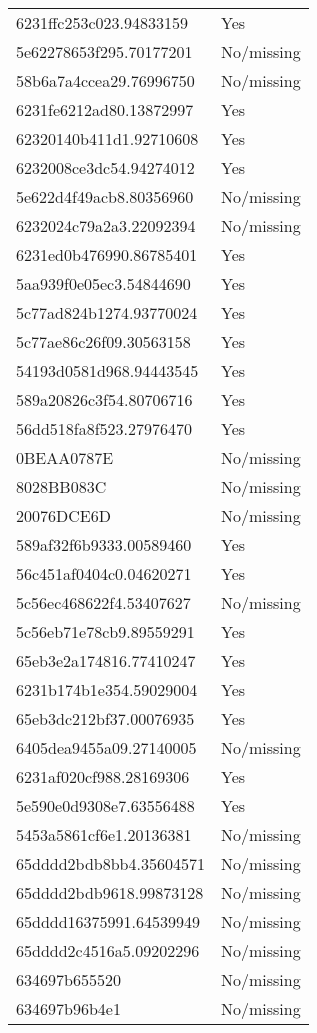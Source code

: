 \begin{tabular}{ll}
6231ffc253c023.94833159 & Yes \\
5e62278653f295.70177201 & No/missing \\
58b6a7a4ccea29.76996750 & No/missing \\
6231fe6212ad80.13872997 & Yes \\
62320140b411d1.92710608 & Yes \\
6232008ce3dc54.94274012 & Yes \\
5e622d4f49acb8.80356960 & No/missing \\
6232024c79a2a3.22092394 & No/missing \\
6231ed0b476990.86785401 & Yes \\
5aa939f0e05ec3.54844690 & Yes \\
5c77ad824b1274.93770024 & Yes \\
5c77ae86c26f09.30563158 & Yes \\
54193d0581d968.94443545 & Yes \\
589a20826c3f54.80706716 & Yes \\
56dd518fa8f523.27976470 & Yes \\
0BEAA0787E & No/missing \\
8028BB083C & No/missing \\
20076DCE6D & No/missing \\
589af32f6b9333.00589460 & Yes \\
56c451af0404c0.04620271 & Yes \\
5c56ec468622f4.53407627 & No/missing \\
5c56eb71e78cb9.89559291 & Yes \\
65eb3e2a174816.77410247 & Yes \\
6231b174b1e354.59029004 & Yes \\
65eb3dc212bf37.00076935 & Yes \\
6405dea9455a09.27140005 & No/missing \\
6231af020cf988.28169306 & Yes \\
5e590e0d9308e7.63556488 & Yes \\
5453a5861cf6e1.20136381 & No/missing \\
65dddd2bdb8bb4.35604571 & No/missing \\
65dddd2bdb9618.99873128 & No/missing \\
65dddd16375991.64539949 & No/missing \\
65dddd2c4516a5.09202296 & No/missing \\
634697b655520 & No/missing \\
634697b96b4e1 & No/missing \\

\end{tabular}
